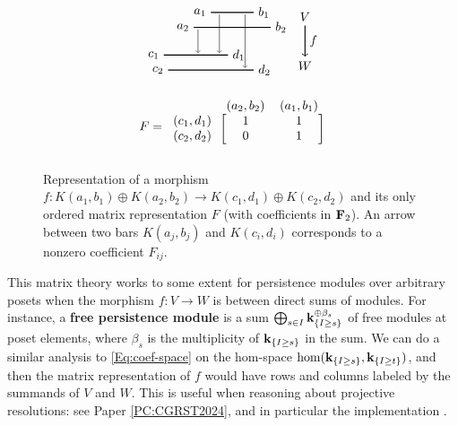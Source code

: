 \begin{figure}[tbp]
  \centering
  \begin{subfigure}[tbp]{.45\textwidth}
    \[
    \begin{tikzpicture}[xscale=1.2, yscale=.6, thick]
      \draw[-] (1.8,2.5) node[left] {$a_1$} -- (2.8,2.5) node[right] {$b_1$};
      \draw[-] (1.4,1.8) node[left] {$a_2$} -- (3.2,1.8) node[right] {$b_2$};
          
      \draw[-] (0.7,0.5) node[left] {$c_1$} -- (2.2,0.5) node[right] {$d_1$};
      \draw[-] (0.8,-0.2) node[left] {$c_2$} -- (2.8,-0.2) node[right] {$d_2$};

      \draw[->, thin] (2,2.4) -- (2,0.6);
      \draw[->, thin] (1.5,1.7) -- (1.5,0.6);
      \draw[->, thin] (2.6,2.4) -- (2.6,-0.1);

      \node (X) at (4, 2.3) {$V$};
      \node (Y) at (4, 0) {$W$};
      \draw[->] (X) -- node[right] {$f$} (Y);
    \end{tikzpicture}
    \]
  \end{subfigure}
  \hfill
  \begin{subfigure}[tbp]{.45\textwidth}
    \[
      F = \begin{blockarray}{c cc}
        & (a_2, b_2) & (a_1, b_1) \\
        \begin{block}{c [cc]}
          (c_1, d_1) & 1 & 1 \\
          (c_2, d_2) & 0 & 1 \\
        \end{block}
      \end{blockarray}
    \]
  \end{subfigure}
  \caption[Representation of a morphism and its only ordered matrix representation]{Representation of a morphism $f \colon K(a_1,b_1) \oplus K(a_2,b_2) \rightarrow K(c_1,d_1) \oplus K(c_2,d_2)$ and its only ordered matrix representation $F$ (with coefficients in $\bf{F}_2$). An arrow between two bars $K(a_j,b_j)$ and $K(c_i,d_i)$ corresponds to a nonzero coefficient $F_{ij}$.}
  \label{F:morphism}
\end{figure}

\begin{remark}
\label{R:free}
  This matrix theory works to some extent for persistence modules over arbitrary posets when the morphism $f \colon V \to W$ is between direct sums of modules. For instance, a \textbf{free persistence module} is a sum $\bigoplus_{s \in I} \K_{\{I \geq s\}}^{\oplus \beta_s}$ of free modules at poset elements, where $\beta_s$ is the multiplicity of $\K_{\{I \geq s\}}$ in the sum. We can do a similar analysis to \eqref{Eq:coef-space} on the hom-space $\hom(\K_{\{I \geq s\}}, \K_{\{I \geq t\}})$, and then the matrix representation of $f$ would have rows and columns labeled by the summands of $V$ and $W$. This is useful when reasoning about projective resolutions: see Paper \ref{PC:CGRST2024}, and in particular the implementation \cite{lowerhooks}.
\end{remark}


